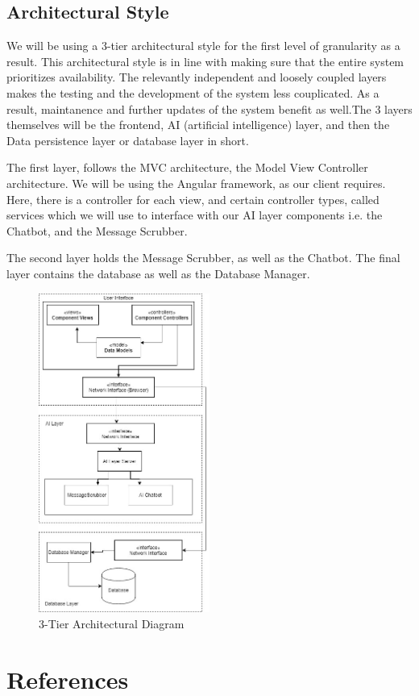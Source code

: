 \documentclass[11pt]{article}
\begin{document}
\subsection{Architectural Style}

We will be using a 3-tier architectural style for the first level of granularity as a result. This architectural style is in line with making sure that the entire system prioritizes availability. The relevantly independent and loosely coupled layers makes the testing and the development of the system less couplicated. As a result, maintanence and further updates of the system benefit as well.The 3 layers themselves will be the frontend, AI (artificial intelligence) layer, and then the Data persistence layer or database layer in short.\par

The first layer, follows the MVC architecture, the Model View Controller architecture. We will be using the Angular framework, as our client requires. Here, there is a controller for each view, and certain controller types, called services which we will use to interface with our AI layer components i.e. the Chatbot, and the Message Scrubber.\par

The second layer holds the Message Scrubber, as well as the Chatbot. The final layer contains the database as well as the Database Manager.

\begin{figure}[H]
	\centering
	\includegraphics[width=0.5\textwidth]{../../images/Botic_Simplified_Architectural_Design.jpg}
	\caption{3-Tier Architectural Diagram}
\end{figure}

\section{References}


\end{document}
